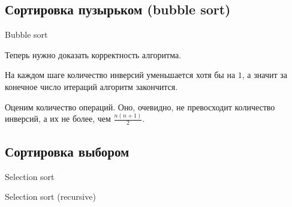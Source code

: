 \newpage
\subsection{Сортировка пузырьком (bubble sort)}

    \begin{algorithm}
        \caption{Bubble sort}
        \begin{algorithmic}
                    \EndIf
                \EndFor
            \EndWhile
        \end{algorithmic}
    \end{algorithm}

    Теперь нужно доказать корректность алгоритма.
    \begin{proof_cor}
        На каждом шаге количество инверсий уменьшается хотя бы на $1$, а значит за конечное число итераций алгоритм закончится.
    \end{proof_cor}

    Оценим количество операций. Оно, очевидно, не превосходит количество инверсий, а их не более, чем $\frac{n(n+1)}{2}$. \par

\subsection{Сортировка выбором}
    \begin{algorithm}
        \caption{Selection sort}
        \begin{algorithmic}
                \State {}
            \EndFor
        \end{algorithmic}
    \end{algorithm}

    \begin{algorithm}
        \caption{Selection sort (recursive)}
        \begin{algorithmic}
                 \Return \EndIf
                \State {}
                \State {}
            \EndFunction
        \end{algorithmic}
    \end{algorithm}    

